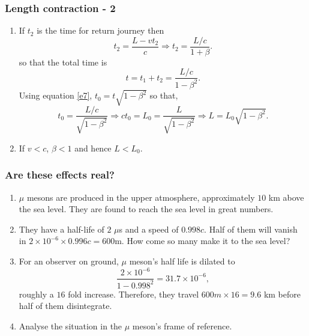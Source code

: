 \documentclass{beamer}
\begin{document}
\begin{frame}
\frametitle{Length contraction - 2}
\begin{enumerate}
\item If $t_2$ is the time for return journey then
\begin{equation}\label{e10}
t_2 = \frac{L - vt_2}{c} \Rightarrow t_2 = \frac{L/c}{1 + \beta}.
\end{equation}
so that the total time is
\begin{equation}\label{e11}
t = t_1 + t_2 = \frac{L/c}{1 - \beta^2}.
\end{equation}
Using equation \eqref{e7}, $t_0 = t\sqrt{1 - \beta^2}$ so that,
\begin{equation}\label{e12}
t_0 = \frac{L/c}{\sqrt{1 - \beta^2}} \Rightarrow ct_0 = L_0 = \frac{L}{\sqrt{1 - \beta^2}}
\Rightarrow L = L_0\sqrt{1 - \beta^2}.
\end{equation}

\item If $v < c$, $\beta < 1$ and hence $L < L_0$.
\end{enumerate}
\end{frame}

\begin{frame}
\frametitle{Are these effects real?}
\begin{enumerate}
\item $\mu$ mesons are produced in the upper atmosphere, approximately $10$ km
above the sea level. They are found to reach the sea level in great numbers.
\item They have a half-life of $2$ $\mu$s and a speed of $0.998c$. Half of them
will vanish in $2 \times 10^{-6} \times 0.996c = 600$m. How come so many make it
to the sea level? 
\item For an observer on ground, $\mu$ meson's half life is dilated to 
\[
\frac{2 \times 10^{-6}}{1 - 0.998^2} = 31.7 \times 10^{-6},
\]
roughly a $16$ fold increase. Therefore, they travel $600m \times 16 = 9.6$ km
before half of them disintegrate.
\item Analyse the situation in the $\mu$ meson's frame of reference.
\end{enumerate}
\end{frame}
\end{document}
